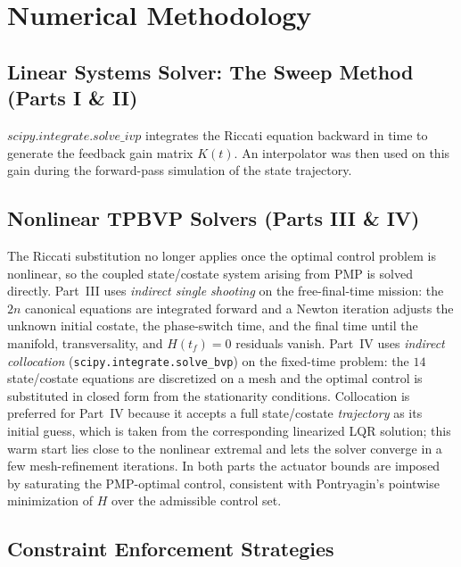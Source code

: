 \documentclass[letterpaper, 10 pt, conference]{ieeeconf}
\begin{document}
\section{Numerical Methodology}

\subsection{Linear Systems Solver: The Sweep Method (Parts I \& II)}
$scipy.integrate.solve\_ivp$ integrates the Riccati equation backward in time to generate the feedback gain matrix $K(t)$. An interpolator was then used on this gain during the forward-pass simulation of the state trajectory.

\subsection{Nonlinear TPBVP Solvers (Parts III \& IV)}
The Riccati substitution no longer applies once the optimal control problem is nonlinear, so the coupled state/costate system arising from PMP is solved directly. Part~III uses \emph{indirect single shooting} on the free-final-time mission: the $2n$ canonical equations are integrated forward and a Newton iteration adjusts the unknown initial costate, the phase-switch time, and the final time until the manifold, transversality, and $H(t_f)=0$ residuals vanish. Part~IV uses \emph{indirect collocation} (\texttt{scipy.integrate.solve\_bvp}) on the fixed-time problem: the $14$ state/costate equations are discretized on a mesh and the optimal control is substituted in closed form from the stationarity conditions. Collocation is preferred for Part~IV because it accepts a full state/costate \emph{trajectory} as its initial guess, which is taken from the corresponding linearized LQR solution; this warm start lies close to the nonlinear extremal and lets the solver converge in a few mesh-refinement iterations. In both parts the actuator bounds are imposed by saturating the PMP-optimal control, consistent with Pontryagin's pointwise minimization of $H$ over the admissible control set.

\subsection{Constraint Enforcement Strategies}
\end{document}
